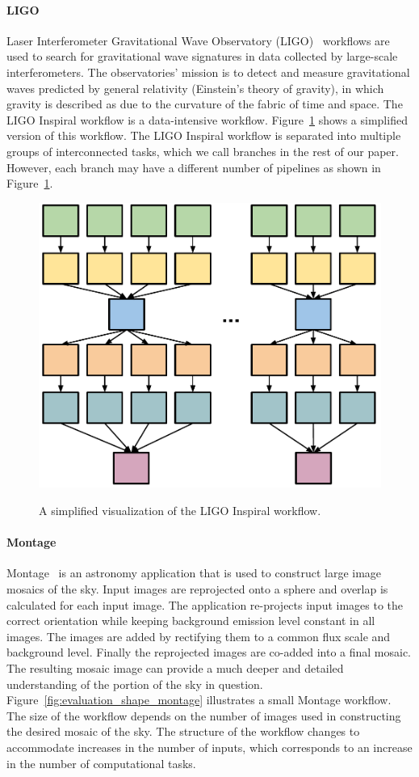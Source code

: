 \paragraph{\textbf{LIGO}}
Laser Interferometer Gravitational Wave Observatory (LIGO)~\cite{LIGO} workflows are used to search for gravitational wave signatures in data collected by large-scale interferometers. The observatories' mission is to detect and measure gravitational waves predicted by general relativity (Einstein's theory of gravity), in which gravity is described as due to the curvature of the fabric of time and space. The LIGO Inspiral workflow is a data-intensive workflow. Figure~\ref{fig:evaluation_shape_ligo} shows a simplified version of this workflow. The LIGO Inspiral workflow is separated into multiple groups of interconnected tasks, which we call branches in the rest of our paper. However, each branch may have a different number of pipelines as shown in Figure~\ref{fig:evaluation_shape_ligo}. 

\begin{figure}[!htb]
	\centering
	\includegraphics[width=0.6\linewidth]{figures/balance/figure14.pdf} \\
	\caption{A simplified visualization of the LIGO Inspiral workflow.}
	\label{fig:evaluation_shape_ligo}
\end{figure}

\paragraph{\textbf{Montage}}
Montage~\cite{Berriman2004} is an astronomy application that is used to construct large image mosaics of the sky. Input images are reprojected onto a sphere and overlap is calculated for each input image. The application re-projects input images to the correct orientation while keeping background emission level constant in all images. The images are added by rectifying them to a common flux scale and background level. Finally the reprojected images are co-added into a final mosaic. The resulting mosaic image can provide a much deeper and detailed understanding of the portion of the sky in question. Figure~\ref{fig:evaluation_shape_montage} illustrates a small Montage workflow. The size of the workflow depends on the number of images used in constructing the desired mosaic of the sky. The structure of the workflow changes to accommodate increases in the number of inputs, which corresponds to an increase in the number of computational tasks.

